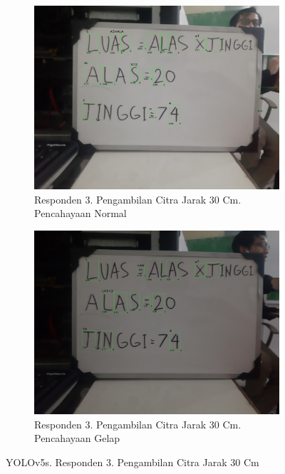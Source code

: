 \begin{figure}[H]
  \begin{subfigure}{.5\textwidth}
    \centering
    \captionsetup{width=.8\linewidth}
    \includegraphics[width=.8\linewidth]{gambar/yolov5s/responden3/hans30cm00-result.jpg}
    \caption{Responden 3. Pengambilan Citra Jarak 30 Cm. Pencahayaan Normal}
    \label{fig:sr3tcitra30cm}
  \end{subfigure}%
  \begin{subfigure}{.5\textwidth}
    \centering
    \captionsetup{width=.8\linewidth}
    \includegraphics[width=.8\linewidth]{gambar/yolov5s/responden3/hans30cm10-result.jpg}
    \caption{Responden 3. Pengambilan Citra Jarak 30 Cm. Pencahayaan Gelap}
    \label{fig:sr3gcitra30cm}
  \end{subfigure}
  \caption{YOLOv5s. Responden 3. Pengambilan Citra Jarak 30 Cm}
  \label{fig:sr3citra30cm}
\end{figure}

